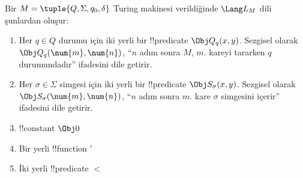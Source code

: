 \begin{defn}
Bir $M=\tuple{Q,\Sigma,q_0,\delta}$ Turing makinesi verildiğinde
$\Lang L_M$ dili şunlardan oluşur:
\begin{enumerate}
\item Her $q\in Q$ durumu için iki yerli bir !!{predicate}
  $\Obj Q_q(x,y)$. Sezgisel olarak $\Obj Q_q(\num{m},\num{n})$, ``$n$ adım
  sonra $M$, $m$. kareyi tararken $q$ durumundadır'' ifadesini dile getirir.
\item Her $\sigma\in\Sigma$ simgesi için iki yerli bir !!{predicate}
  $\Obj S_\sigma(x,y)$. Sezgisel olarak
  $\Obj S_\sigma(\num{m},\num{n})$, ``$n$ adım sonra $m$. kare $\sigma$
  simgesini içerir'' ifadesini dile getirir.
\item !!{constant} $\Obj 0$
\item Bir yerli !!{function} $\prime$
\item İki yerli !!{predicate} $<$
\end{enumerate}
\end{defn}

